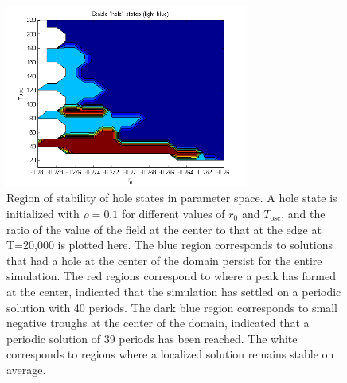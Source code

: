 \documentclass[pre,preprint,superscriptaddress]{revtex4-1}
\begin{document}
\begin{figure}[!htb]\center
\includegraphics[width=80mm]{StableDefectV0.png}
\caption{Region of stability of hole states in parameter space.  A hole state is initialized with $\rho=0.1$ for different values of $r_0$ and $T_{\text{osc}}$, and the ratio of the value of the field at the center to that at the edge at T=20,000 is plotted here.  The blue region corresponds to solutions that had a hole at the center of the domain persist for the entire simulation.  The red regions correspond to where a peak has formed at the center, indicated that the simulation has settled on a periodic solution with 40 periods.  The dark blue region corresponds to small negative troughs at the center of the domain, indicated that a periodic solution of 39 periods has been reached.  The white corresponds to regions where a localized solution remains stable on average.}
    \label{fig:holestability}
\end{figure}





\end{document}
